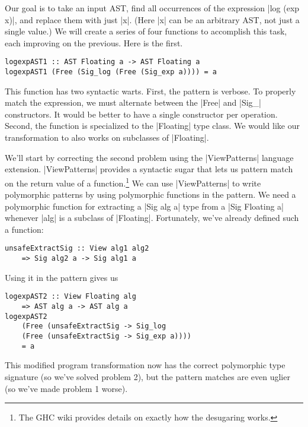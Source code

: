 \documentclass[preprint]{sigplanconf}
\theoremstyle{definition}
\begin{document}
Our goal is to take an input AST,
find all occurrences of the expression |log (exp x)|,
and replace them with just |x|.
(Here |x| can be an arbitrary AST, not just a single value.)
We will create a series of four functions to accomplish this task,
each improving on the previous.
Here is the first.
\begin{lstlisting}
logexpAST1 :: AST Floating a -> AST Floating a
logexpAST1 (Free (Sig_log (Free (Sig_exp a)))) = a
\end{lstlisting}
This function has two syntactic warts.
First, the pattern is verbose.
To properly match the expression, we must alternate between the |Free| and |Sig_| constructors.
It would be better to have a single constructor per operation.
Second, the function is specialized to the |Floating| type class.
We would like our transformation to also works on subclasses of |Floating|.

We'll start by correcting the second problem using the |ViewPatterns| language extension.
|ViewPatterns| provides a syntactic sugar that lets us pattern match on the return value of a function.\footnote{
    The GHC wiki \cite{viewpatterns} provides details on exactly how the desugaring works.
}
We can use |ViewPatterns| to write polymorphic patterns by using polymorphic functions in the pattern.
We need a polymorphic function for extracting a |Sig alg a| type from a |Sig Floating a| whenever |alg| is a subclass of |Floating|.
Fortunately, we've already defined such a function:
\begin{lstlisting}
unsafeExtractSig :: View alg1 alg2
    => Sig alg2 a -> Sig alg1 a
\end{lstlisting}
Using it in the pattern gives us
\begin{lstlisting}
logexpAST2 :: View Floating alg
    => AST alg a -> AST alg a
logexpAST2
    (Free (unsafeExtractSig -> Sig_log
    (Free (unsafeExtractSig -> Sig_exp a))))
    = a
\end{lstlisting}
This modified program transformation now has the correct polymorphic type signature
(so we've solved problem 2),
but the pattern matches are even uglier
(so we've made problem 1 worse).
\end{document}
